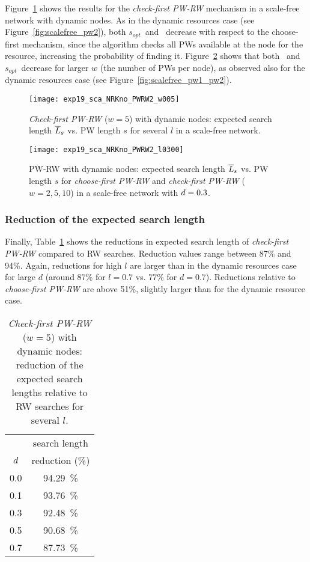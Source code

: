 \documentclass[]{elsarticle}
\newcommand{\s}		{\ensuremath{s}}		\newcommand{\sopt}	{\ensuremath{s_{opt}}}		\newcommand{\p}		{\ensuremath{p}}		\newcommand{\W}		{\ensuremath{W}}		\newcommand{\w}		{\ensuremath{w}}		\newcommand{\lsave}	{\ensuremath{\overline{l}_s}}	\newcommand{\lave}	{\ensuremath{\overline{l}}}	\newcommand{\lopt}	{\ensuremath{\overline{l}_{opt}}}
\begin{document}
Figure~\ref{fig:scalefree_pw2_dynnodes} shows the results for the \emph{check-first PW-RW} mechanism in a scale-free network with dynamic nodes. As in the dynamic resources case (see Figure~\ref{fig:scalefree_pw2}), both \sopt\ and \Lexpopt\ decrease with respect to the choose-first mechanism, since the algorithm checks all PWs available at the node for the resource, increasing the probability of finding it. Figure~\ref{fig:scalefree_pw1_pw2_dynnodes} shows that both \Lexpopt\ and \sopt\ decrease for larger $w$ (the number of PWs per node), as observed also for the dynamic resources case (see Figure~\ref{fig:scalefree_pw1_pw2}). \\
\begin{figure}
 \centering
 \texttt{[image: exp19\_sca\_NRKno\_PWRW2\_w005]}
 \caption{\emph{Check-first PW-RW} ($\w=5$) with dynamic nodes: expected search length $\overline{L}_s$ vs. PW length $\s$ for several $l$ in a scale-free network.}
 \label{fig:scalefree_pw2_dynnodes}
\end{figure}
\begin{figure}
 \centering
 \texttt{[image: exp19\_sca\_NRKno\_PWRW2\_l0300]}
 \caption{PW-RW with dynamic nodes: expected search length $\overline{L}_s$ vs. PW length $\s$ for \emph{choose-first PW-RW} and \emph{check-first PW-RW} ($\w = 2, 5, 10$) in a scale-free network with $d=0.3$.}
 \label{fig:scalefree_pw1_pw2_dynnodes}
\end{figure}


\subsubsection{Reduction of the expected search length}

Finally, Table~\ref{tab:H_reduction_RW_PWRW2_dynnodes} shows the reductions in expected search length of \emph{check-first PW-RW} compared to RW searches. Reduction values range between 87\% and 94\%. Again, reductions for high $l$ are larger than in the dynamic resources case for large $d$ (around 87\% for $l=0.7$ vs. 77\% for $d=0.7$). Reductions relative to \emph{choose-first PW-RW} are above 51\%, slightly larger than for the dynamic resource case.
\begin{table}
\centering
\begin{tabular}{|c|c|}
\hline
\rule{0pt}{11pt}   & search length \\ 
              $d$  & reduction (\%)\\ \hline
              0.0  &  94.29~\% \\
              0.1  & 93.76~\% \\
              0.3  & 92.48~\% \\
              0.5  & 90.68~\% \\
              0.7  & 87.73~\% \\
\hline
\end{tabular}
\caption{\emph{Check-first PW-RW} ($\w=5$) with dynamic nodes: reduction of the expected search lengths relative to RW searches for several $l$.}
\label{tab:H_reduction_RW_PWRW2_dynnodes}
\end{table}
\end{document}
